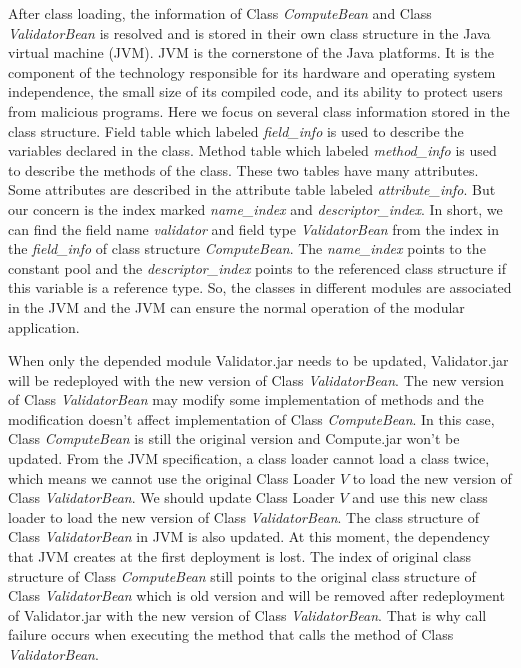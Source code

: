 \documentclass[conference]{IEEEtran}
\begin{document}
After class loading, the information of Class \emph{ComputeBean} and Class \emph{ValidatorBean} is resolved and is stored in their own class structure in the Java virtual machine (JVM). 
JVM is the cornerstone of the Java platforms. It is the component of the technology responsible for its hardware and operating system independence, the small size of its compiled code, and its ability to protect users from malicious programs\cite{jvm}. 
Here we focus on several class information stored in the class structure. 
Field table which labeled \emph{field\_info} is used to describe the variables declared in the class. 
Method table which labeled \emph{method\_info} is used to describe the methods of the class. 
These two tables have many attributes. 
Some attributes are described in the attribute table labeled \emph{attribute\_info}. 
But our concern is the index marked \emph{name\_index} and \emph{descriptor\_index}. 
In short, we can find the field name \emph{validator} and field type \emph{ValidatorBean} from the index in the \emph{field\_info} of class structure \emph{ComputeBean}. 
The \emph{name\_index} points to the constant pool and the \emph{descriptor\_index} points to the referenced class structure if this variable is a reference type\cite{jvm_book}. 
So, the classes in different modules are associated in the JVM and the JVM can ensure the normal operation of the modular application.

When only the depended module Validator.jar needs to be updated, Validator.jar will be redeployed with the new version of Class \emph{ValidatorBean}. 
The new version of Class \emph{ValidatorBean} may modify some implementation of methods and the modification doesn’t affect implementation of Class \emph{ComputeBean}. 
In this case, Class \emph{ComputeBean} is still the original version and Compute.jar won’t be updated. 
From the JVM specification\cite{jvm_specification}, a class loader cannot load a class twice, which means we cannot use the original Class Loader $V$ to load the new version of Class \emph{ValidatorBean}. 
We should update Class Loader $V$ and use this new class loader to load the new version of Class \emph{ValidatorBean}. 
The class structure of Class \emph{ValidatorBean} in JVM is also updated. 
At this moment, the dependency that JVM creates at the first deployment is lost. 
The index of original class structure of Class \emph{ComputeBean} still points to the original class structure of Class \emph{ValidatorBean} which is old version and will be removed after redeployment of Validator.jar with the new version of Class \emph{ValidatorBean}. 
That is why call failure occurs when executing the method that calls the method of Class \emph{ValidatorBean}.
\end{document}
